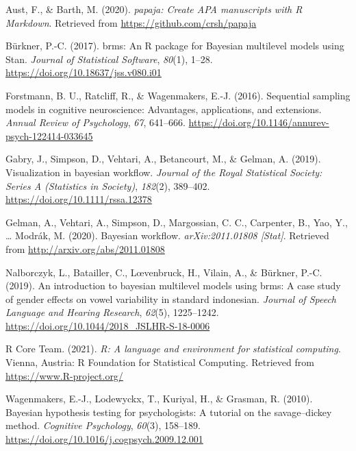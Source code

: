 \documentclass[
  11pt,
  english,
  ,doc,floatsintext]{apa6}
\newlength{\cslhangindent}
\newlength{\cslentryspacingunit} %
\newenvironment{CSLReferences}[2] %
 {%
  \setlength{\parindent}{0pt}
  \ifodd #1
  \let\oldpar\par
  \def\par{\hangindent=\cslhangindent\oldpar}
  \fi
  \setlength{\parskip}{#2\cslentryspacingunit}
 }%
 {}
\begin{document}
\hypertarget{refs}{}
\begin{CSLReferences}{1}{0}
\leavevmode{}%
Aust, F., \& Barth, M. (2020). \emph{{papaja}: {Create} {APA} manuscripts with {R Markdown}}. Retrieved from \url{https://github.com/crsh/papaja}

\leavevmode{}%
Bürkner, P.-C. (2017). {brms}: An {R} package for {Bayesian} multilevel models using {Stan}. \emph{Journal of Statistical Software}, \emph{80}(1), 1--28. \url{https://doi.org/10.18637/jss.v080.i01}

\leavevmode{}%
Forstmann, B. U., Ratcliff, R., \& Wagenmakers, E.-J. (2016). Sequential sampling models in cognitive neuroscience: Advantages, applications, and extensions. \emph{Annual Review of Psychology}, \emph{67}, 641--666. \url{https://doi.org/10.1146/annurev-psych-122414-033645}

\leavevmode{}%
Gabry, J., Simpson, D., Vehtari, A., Betancourt, M., \& Gelman, A. (2019). Visualization in bayesian workﬂow. \emph{Journal of the Royal Statistical Society: Series A (Statistics in Society)}, \emph{182}(2), 389--402. \url{https://doi.org/10.1111/rssa.12378}

\leavevmode{}%
Gelman, A., Vehtari, A., Simpson, D., Margossian, C. C., Carpenter, B., Yao, Y., \ldots{} Modrák, M. (2020). Bayesian workflow. \emph{{arXiv}:2011.01808 {[}Stat{]}}. Retrieved from \url{http://arxiv.org/abs/2011.01808}

\leavevmode{}%
Nalborczyk, L., Batailler, C., Lœvenbruck, H., Vilain, A., \& Bürkner, P.-C. (2019). An introduction to bayesian multilevel models using brms: A case study of gender effects on vowel variability in standard indonesian. \emph{Journal of Speech Language and Hearing Research}, \emph{62}(5), 1225--1242. \url{https://doi.org/10.1044/2018_JSLHR-S-18-0006}

\leavevmode{}%
R Core Team. (2021). \emph{R: A language and environment for statistical computing}. Vienna, Austria: R Foundation for Statistical Computing. Retrieved from \url{https://www.R-project.org/}

\leavevmode{}%
Wagenmakers, E.-J., Lodewyckx, T., Kuriyal, H., \& Grasman, R. (2010). Bayesian hypothesis testing for psychologists: A tutorial on the savage--dickey method. \emph{Cognitive Psychology}, \emph{60}(3), 158--189. \url{https://doi.org/10.1016/j.cogpsych.2009.12.001}


\end{CSLReferences}
\end{document}
